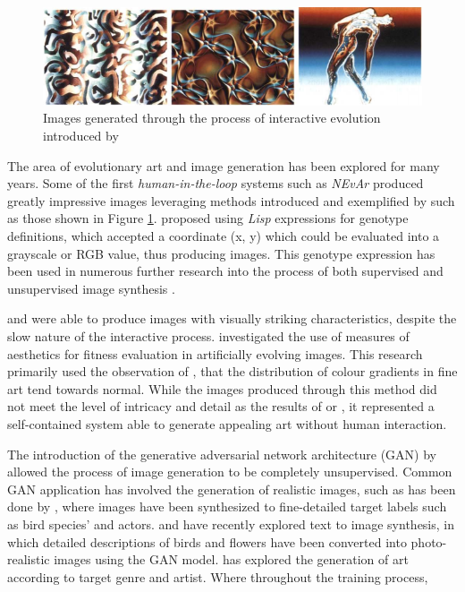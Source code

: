 \documentclass{article}
\begin{document}
\begin{figure}[h!]
	\includegraphics[width=\textwidth]{images/sims-interactive-image-generation.png}
	\caption{Images generated through the process of interactive evolution introduced by \citet{sims}}
	\label{fig:sims}
\end{figure}

The area of evolutionary art and image generation has been explored for many years.
Some of the first \textit{human-in-the-loop} systems such as \textit{NEvAr} \citep{nevar} produced greatly impressive images leveraging methods introduced and exemplified by \citet{sims} such as those shown in Figure \ref{fig:sims}.
\citet{sims} proposed using \textit{Lisp} expressions for genotype definitions, which accepted a coordinate (x, y) which could be evaluated into a grayscale or RGB value, thus producing images.
This genotype expression has been used in numerous further research into the process of both supervised and unsupervised image synthesis \citep{nevar, sims, den2011evolving, distributed-evolutionary-art, aesthetic-measures}.

\citet{sims} and \citet{nevar} were able to produce images with visually striking characteristics, despite the slow nature of the interactive process.
\citet{aesthetic-measures} investigated the use of measures of aesthetics for fitness evaluation in artificially evolving images.
This research primarily used the observation of \citet{ralph-bell-curve}, that the distribution of colour gradients in fine art tend towards normal.
While the images produced through this method did not meet the level of intricacy and detail as the results of \citet{sims} or \citet{nevar}, it represented a self-contained system able to generate appealing art without human interaction.

The introduction of the generative adversarial network architecture (GAN) by \citet{GAN} allowed the process of image generation to be completely unsupervised.
Common GAN application has involved the generation of realistic images, such as has been done by \citet{bao2017cvae}, where images have been synthesized to fine-detailed target labels such as bird species' and actors.
\citet{zhang2017stackgan} and \citet{reed2016generative} have recently explored text to image synthesis, in which detailed descriptions of birds and flowers have been converted into photo-realistic images using the GAN model.
\citet{tan2017artgan} has explored the generation of art according to target genre and artist.
Where throughout the training process,
\end{document}
